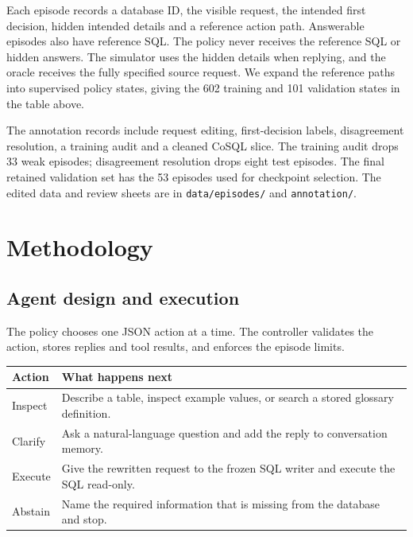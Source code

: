 \documentclass[11pt,a4paper]{article}
\newcommand{\file}[1]{\nolinkurl{#1}}
\begin{document}
Each episode records a database ID, the visible request, the intended first decision, hidden intended
details and a reference action path. Answerable episodes also have reference SQL. The policy never
receives the reference SQL or hidden answers. The simulator uses the hidden details when replying, and
the oracle receives the fully specified source request. We expand the reference paths into supervised
policy states, giving the 602 training and 101 validation states in the table above.

The annotation records include request editing, first-decision labels, disagreement resolution,
a training audit and a cleaned CoSQL slice. The training audit drops 33 weak episodes; disagreement
resolution drops eight test episodes. The final retained validation set has the 53 episodes used
for checkpoint selection. The edited data and review sheets are in \file{data/episodes/} and
\file{annotation/}.

\section{Methodology}

\subsection{Agent design and execution}

The policy chooses one JSON action at a time. The controller validates the action, stores replies and
tool results, and enforces the episode limits.

\begin{tabularx}{\linewidth}{@{}lY@{}}
\toprule
Action & What happens next \\
\midrule
Inspect & Describe a table, inspect example values, or search a stored glossary definition. \\
Clarify & Ask a natural-language question and add the reply to conversation memory. \\
Execute & Give the rewritten request to the frozen SQL writer and execute the SQL read-only. \\
Abstain & Name the required information that is missing from the database and stop. \\
\bottomrule
\end{tabularx}

\begin{center}
\end{center}
\end{document}
